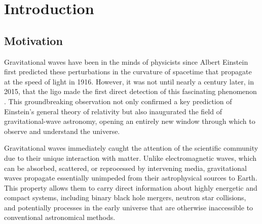 
\chapter{Introduction}
\label{chapter:introduction}


\section{Motivation}
\label{section:motivation}

Gravitational waves have been in the minds of physicists since Albert Einstein first predicted these perturbations in the curvature of spacetime that propagate at the speed of light in 1916. However, it was not until nearly a century later, in 2015, that the \acrfull{ligo} made the first direct detection of this fascinating phenomenon \cite{PhysRevLett.116.061102}. This groundbreaking observation not only confirmed a key prediction of Einstein's general theory of relativity but also inaugurated the field of gravitational-wave astronomy, opening an entirely new window through which to observe and understand the universe.

Gravitational waves immediately caught the attention of the scientific community due to their unique interaction with matter. Unlike electromagnetic waves, which can be absorbed, scattered, or reprocessed by intervening media, gravitational waves propagate essentially unimpeded from their astrophysical sources to Earth. This property allows them to carry direct information about highly energetic and compact systems, including binary black hole mergers, neutron star collisions, and potentially processes in the early universe that are otherwise inaccessible to conventional astronomical methods.

